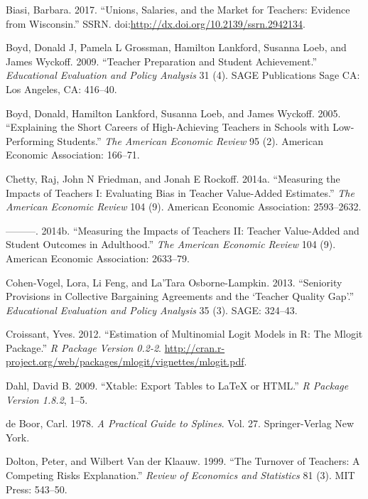 \documentclass[12pt,]{article}
\begin{document}
\hypertarget{ref-biasi}{}
Biasi, Barbara. 2017. ``Unions, Salaries, and the Market for Teachers:
Evidence from Wisconsin.'' SSRN.
doi:\href{https://doi.org/http://dx.doi.org/10.2139/ssrn.2942134}{http://dx.doi.org/10.2139/ssrn.2942134}.

\hypertarget{ref-boyd2009}{}
Boyd, Donald J, Pamela L Grossman, Hamilton Lankford, Susanna Loeb, and
James Wyckoff. 2009. ``Teacher Preparation and Student Achievement.''
\emph{Educational Evaluation and Policy Analysis} 31 (4). SAGE
Publications Sage CA: Los Angeles, CA: 416--40.

\hypertarget{ref-boyd2005}{}
Boyd, Donald, Hamilton Lankford, Susanna Loeb, and James Wyckoff. 2005.
``Explaining the Short Careers of High-Achieving Teachers in Schools
with Low-Performing Students.'' \emph{The American Economic Review} 95
(2). American Economic Association: 166--71.

\hypertarget{ref-chettyI}{}
Chetty, Raj, John N Friedman, and Jonah E Rockoff. 2014a. ``Measuring
the Impacts of Teachers I: Evaluating Bias in Teacher Value-Added
Estimates.'' \emph{The American Economic Review} 104 (9). American
Economic Association: 2593--2632.

\hypertarget{ref-chettyII}{}
---------. 2014b. ``Measuring the Impacts of Teachers II: Teacher
Value-Added and Student Outcomes in Adulthood.'' \emph{The American
Economic Review} 104 (9). American Economic Association: 2633--79.

\hypertarget{ref-cohenvogel}{}
Cohen-Vogel, Lora, Li Feng, and La'Tara Osborne-Lampkin. 2013.
``Seniority Provisions in Collective Bargaining Agreements and the
`Teacher Quality Gap'.'' \emph{Educational Evaluation and Policy
Analysis} 35 (3). SAGE: 324--43.

\hypertarget{ref-croissant}{}
Croissant, Yves. 2012. ``Estimation of Multinomial Logit Models in R:
The Mlogit Package.'' \emph{R Package Version 0.2-2}.
\url{http://cran.r-project.org/web/packages/mlogit/vignettes/mlogit.pdf}.

\hypertarget{ref-dahl}{}
Dahl, David B. 2009. ``Xtable: Export Tables to LaTeX or HTML.'' \emph{R
Package Version 1.8.2}, 1--5.

\hypertarget{ref-deboor}{}
de Boor, Carl. 1978. \emph{A Practical Guide to Splines}. Vol. 27.
Springer-Verlag New York.

\hypertarget{ref-dolton}{}
Dolton, Peter, and Wilbert Van der Klaauw. 1999. ``The Turnover of
Teachers: A Competing Risks Explanation.'' \emph{Review of Economics and
Statistics} 81 (3). MIT Press: 543--50.
\end{document}
